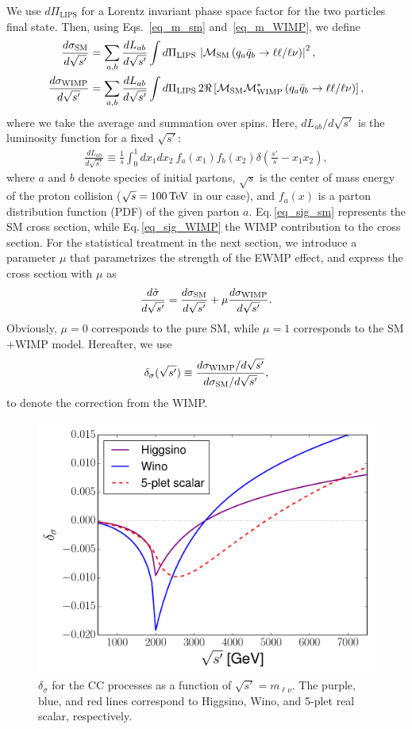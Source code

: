 \documentclass[12pt,twoside,book]{article}
\begin{document}
We use $d\Pi_{\mathrm{LIPS}}$ for a Lorentz invariant phase space factor for the two particles final state.
Then, using Eqs.~\eqref{eq_m_sm} and~\eqref{eq_m_WIMP}, we define
\begin{align}
 \frac{d \sigma_{\rm SM}}{d\sqrt{s'}} &= \sum_{a,b}
 \frac{dL_{ab}}{d\sqrt{s'}} \int d\Pi_{\mathrm{LIPS}}\, \left| \mathcal{M}_{\rm SM} \left( q_a
 \bar{q}_b \to \ell\ell / \ell\nu \right) \right|^2,\label{eq_sig_sm}\\
 \frac{d \sigma_{\rm WIMP}}{d\sqrt{s'}} &= \sum_{a,b}
 \frac{dL_{ab}}{d\sqrt{s'}} \int d\Pi_{\mathrm{LIPS}}\, 2 \Re \left[ \mathcal{M}_{\rm SM}
 \mathcal{M}_{\rm WIMP}^{*} \left( q_a \bar{q}_b \to \ell\ell / \ell\nu
 \right) \right],\label{eq_sig_WIMP}
\end{align}
where we take the average and summation over spins.
Here, $dL_{ab} / d\sqrt{s'}$ is the luminosity function for a fixed
$\sqrt{s'}$:
\begin{align}
 \frac{d L_{ab}}{d\sqrt{s'}} \equiv \frac{1}{s} \int_0^1 dx_1
 dx_2~f_a(x_1) f_b(x_2) \delta\left(\frac{s'}{s} - x_1 x_2\right),
\end{align}
where $a$ and $b$ denote species of initial partons, $\sqrt{s}$ is the center of mass energy of the proton collision ($\sqrt{s} = 100\,{\rm TeV}$ in our case), and $f_a(x)$ is a parton distribution function (PDF) of the given parton $a$.
Eq.\,\eqref{eq_sig_sm} represents the SM cross section, while Eq.\,\eqref{eq_sig_WIMP} the WIMP contribution to the cross section.
For the statistical treatment in the next section, we introduce a parameter $\mu$ that parametrizes the strength of the EWMP effect, and express the cross section with $\mu$ as
\begin{align}
 \frac{d\tilde{\sigma}}{d\sqrt{s'}} =
 \frac{d\sigma_{\rm SM}}{d\sqrt{s'}}
 + \mu \frac{d\sigma_{\rm WIMP}}{d\sqrt{s'}}.
 \label{eq_diffcrosssection}
\end{align}
Obviously, $\mu=0$ corresponds to the pure SM, while $\mu=1$ corresponds to the SM$+$WIMP model.
Hereafter, we use
\begin{align}
 \delta_\sigma ( \sqrt{s'} ) \equiv \frac{d\sigma_{\rm
 WIMP} / d\sqrt{s'}}{d\sigma_{\rm SM} /
 d\sqrt{s'}},\label{eq_dsigma}
\end{align}
to denote the correction from the WIMP.

\begin{figure}[t]
  \centering
  \includegraphics[width=0.5\hsize]{sqsp_vs_del.pdf}
  \caption{
    $\delta_\sigma$ for the CC processes as a function of $\sqrt{s'} = m_{\ell\nu}$.
    The purple, blue, and red lines correspond to Higgsino, Wino, and 5-plet real scalar, respectively.
  }
  \label{fig_sqsp_vs_del}
\end{figure}
\end{document}
